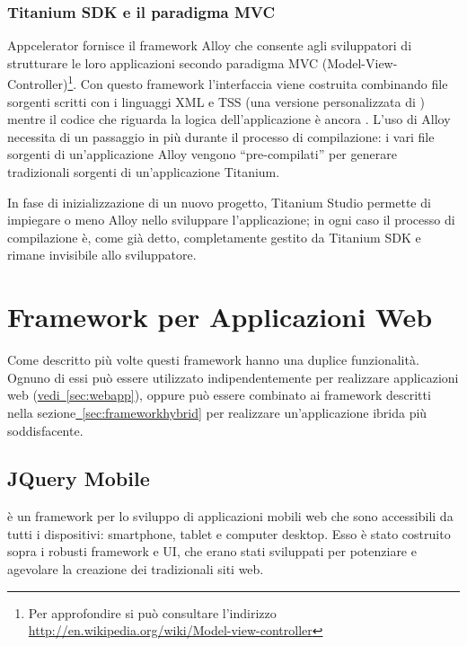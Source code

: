             \subsubsection{Titanium SDK e il paradigma MVC}
            \label{subsub:alloy}
                Appcelerator fornisce il frame\-work Alloy che consente agli
                sviluppatori di strutturare le loro applicazioni secondo
                paradigma MVC (Model-View-Controller)\footnote{Per approfondire
                si può consultare l'indirizzo\\
                \url{http://en.wikipedia.org/wiki/Model-view-controller}}. Con
                questo frame\-work l'interfaccia viene costruita combinando file
                sorgenti scritti con i linguaggi XML e TSS (una versione personalizzata
                di \css{}) mentre il codice che
                riguarda la logica dell'applicazione è ancora \js{}.
                L'uso di Alloy necessita di un passaggio in più durante il
                processo di compilazione: i vari file sorgenti di
                un'applicazione Alloy vengono ``pre-compilati'' per generare
                tradizionali sorgenti \js{} di un'applicazione Titanium.

                In fase di inizializzazione di un nuovo progetto, Titanium Studio
                permette di impiegare o meno Alloy nello sviluppare
                l'applicazione; in ogni caso il processo di compilazione è, come
                già detto, completamente gestito da Titanium SDK e rimane
                invisibile allo sviluppatore.

    \section{Framework per Applicazioni Web}
    \label{sec:frameworkwebapp}

        Come descritto più volte questi frame\-work hanno una duplice funzionalità.
        Ognuno di essi può essere utilizzato indipendentemente per realizzare
        applicazioni web (\hyperref[sec:webapp]{vedi~\ref{sec:webapp}}), oppure
        può essere combinato ai frame\-work descritti nella
        sezione\hyperref[sec:frameworkhybrid]{~\ref{sec:frameworkhybrid}} per
        realizzare un'applicazione ibrida più soddisfacente.

        \subsection{JQuery Mobile}
        \label{subsec:jQuery}
            \jqm{} è un frame\-work per lo sviluppo di applicazioni mobili
            web che sono accessibili da tutti i dispositivi: smartphone, tablet
            e computer desktop. Esso è stato costruito sopra i robusti frame\-work
            \jq{} e \jq{} UI, che erano stati sviluppati per potenziare e
            agevolare la creazione dei tradizionali siti web.

